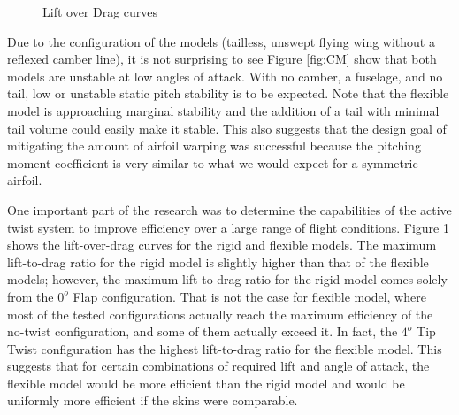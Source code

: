 \documentclass[11pt]{ucthesis}
\begin{document}
\begin{figure}
\hfill
{}
\hfill
{}
\hfill
\caption{Lift over Drag curves}
\label{fig:LD}
\end{figure}
Due to the configuration of the models (tailless, unswept flying wing without a reflexed camber line), it is not surprising to see Figure \ref{fig:CM} show that both models are unstable at low angles of attack. With no camber, a fuselage, and no tail, low or unstable static pitch stability is to be expected. Note that the flexible model is approaching marginal stability and the addition of a tail with minimal tail volume could easily make it stable. This also suggests that the design goal of mitigating the amount of airfoil warping was successful because the pitching moment coefficient is very similar to what we would expect for a symmetric airfoil.

One important part of the research was to determine the capabilities of the active twist system to improve efficiency over a large range of flight conditions. Figure \ref{fig:LD} shows the lift-over-drag curves for the rigid and flexible models. The maximum lift-to-drag ratio for the rigid model is slightly higher than that of the flexible models; however, the maximum lift-to-drag ratio for the rigid model comes solely from the $0^o$ Flap configuration. That is not the case for flexible model, where most of the tested configurations actually reach the maximum efficiency of the no-twist configuration, and some of them actually exceed it. In fact, the $4^o$ Tip Twist configuration has the highest lift-to-drag ratio for the flexible model. This suggests that for certain combinations of required lift and angle of attack, the flexible model would be more efficient than the rigid model and would be uniformly more efficient if the skins were comparable.
\end{document}
